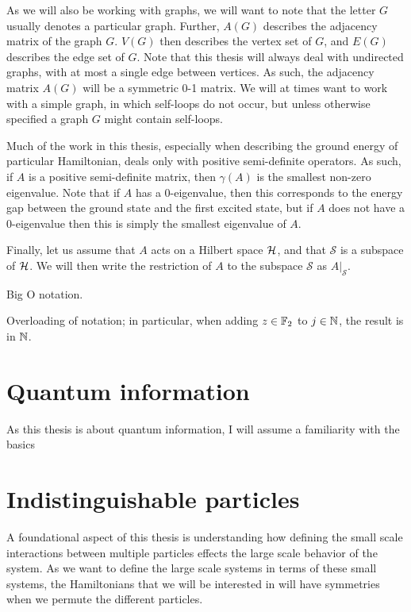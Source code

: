 \documentclass[../thesis-main/thesis-main]{subfiles}
\begin{document}
As we will also be working with graphs, we will want to note that the letter $G$ usually denotes a particular graph.  Further, $A(G)$ describes the adjacency matrix of the graph $G$.  $V(G)$ then describes the vertex set of $G$, and $E(G)$ describes the edge set of $G$.  Note that this thesis will always deal with undirected graphs, with at most a single edge between vertices.  As such, the adjacency matrix $A(G)$ will be a symmetric 0-1 matrix.  We will at times want to work with a simple graph, in which self-loops do not occur, but unless otherwise specified a graph $G$ might contain self-loops.


Much of the work in this thesis, especially when describing the ground energy of particular Hamiltonian, deals only with positive semi-definite operators.  As such, if $A$ is a positive semi-definite matrix, then $\gamma(A)$ is the smallest non-zero eigenvalue.   Note that if $A$ has a 0-eigenvalue, then this corresponds to the energy gap between the ground state and the first excited state, but if $A$ does not have a 0-eigenvalue then this is simply the smallest eigenvalue of $A$.

Finally, let us assume that $A$ acts on a Hilbert space $\mathcal{H}$, and that $\mathcal{S}$ is a subspace of $\mathcal{H}$.  We will then write the restriction of $A$ to the subspace $\mathcal{S}$ as $A\big|_\mathcal{S}$. 

Big O notation.

Overloading of notation; in particular, when adding $z\in \mathbb{F}_2$ to $j\in \mathbb{N}$, the result is in $\mathbb{N}$.

\section{Quantum information}
\label{sec:quantum_information}

As this thesis is about quantum information, I will assume a familiarity with the basics 

\section{Indistinguishable particles}
\label{sec:indistinguishable_particles}

A foundational aspect of this thesis is understanding how defining the small scale interactions between multiple particles effects the large scale behavior of the system.  As we want to define the large scale systems in terms of these small systems, the Hamiltonians that we will be interested in will have symmetries when we permute the different particles.
\end{document}
